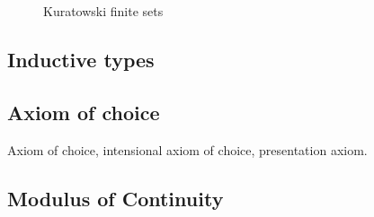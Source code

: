 \begin{figure}
  \caption{Kuratowski finite sets}
  \label{fig:kuratowski}
\end{figure}


\subsection{Inductive types}
\label{sec:inductive-types}



\subsection{Axiom of choice}
\label{sec:axiom-choice}

Axiom of choice, intensional axiom of choice, presentation axiom.


\subsection{Modulus of Continuity}
\label{sec:we-show-modulus-of-continuity-example}

